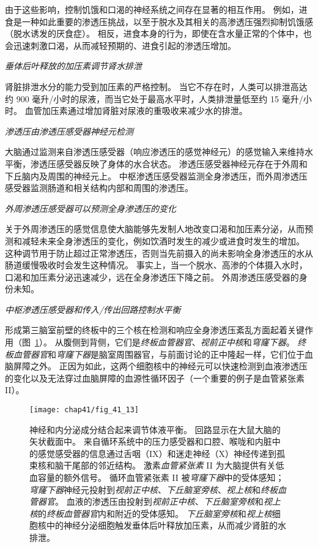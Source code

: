 由于这些影响，控制饥饿和口渴的神经系统之间存在显著的相互作用。
例如，进食是一种如此重要的渗透压挑战，以至于脱水及其相关的高渗透压强烈抑制饥饿感（脱水诱发的厌食症）。
相反，进食本身的行为，即使在含水量正常的个体中，也会迅速刺激口渴，从而减轻预期的、进食引起的渗透压增加。


\textit{垂体后叶释放的加压素调节肾水排泄}

肾脏排泄水分的能力受到加压素的严格控制。
当它不存在时，人类可以排泄高达约 900 毫升/小时的尿液，而当它处于最高水平时，人类排泄量低至约 15 毫升/小时。
血管加压素通过增加肾脏对尿液的重吸收来减少水的排泄。


\textit{渗透压由渗透压感受器神经元检测}

大脑通过监测来自渗透压感受器（响应渗透压的感觉神经元）的感觉输入来维持水平衡，渗透压感受器反映了身体的水合状态。
渗透压感受器神经元存在于外周和下丘脑内及周围的神经元上。
中枢渗透压感受器监测全身渗透压，而外周渗透压感受器监测肠道和相关结构内部和周围的渗透压。


\textit{外周渗透压感受器可以预测全身渗透压的变化}

关于外周渗透压的感觉信息使大脑能够先发制人地改变口渴和加压素分泌，从而预测和减轻未来全身渗透压的变化，例如饮酒时发生的减少或进食时发生的增加。
这种调节用于防止超过正常渗透压，否则当先前摄入的尚未影响全身渗透压的水从肠道缓慢吸收时会发生这种情况。
事实上，当一个脱水、高渗的个体摄入水时，口渴和加压素分泌迅速减少，远在全身渗透压下降之前。
外周渗透压感受器的身份未知。


\textit{中枢渗透压感受器和传入/传出回路控制水平衡}

形成第三脑室前壁的终板中的三个核在检测和响应全身渗透压紊乱方面起着关键作用（图~\ref{fig:41_13}）。
从腹侧到背侧，它们是\textit{终板血管器官}、\textit{视前正中核}和\textit{穹窿下器}。
\textit{终板血管器官}和\textit{穹窿下器}是脑室周围器官，与前面讨论的正中隆起一样，它们位于血脑屏障之外。
正因为如此，这两个细胞核中的神经元可以快速检测到血液渗透压的变化以及无法穿过血脑屏障的血源性循环因子（一个重要的例子是血管紧张素 II）。


\begin{figure}[htbp]
	\centering
	\texttt{[image: chap41/fig\_41\_13]}
	\caption{神经和内分泌成分结合起来调节体液平衡。
		回路显示在大鼠大脑的矢状截面中。
		来自循环系统中的压力感受器和口腔、喉咙和内脏中的感觉感受器的信息通过舌咽（IX）和迷走神经（X）神经传递到孤束核和脑干尾部的邻近结构。
		激素\textit{血管紧张素} II 为大脑提供有关低血容量的额外信号。
		循环血管紧张素 II 被\textit{穹窿下器}中的受体感知； 
		\textit{穹窿下器}神经元投射到\textit{视前正中核}、\textit{下丘脑室旁核}、\textit{视上核}和\textit{终板血管器官}。
		血液的渗透压由投射到\textit{视前正中核}、\textit{下丘脑室旁核}和\textit{视上核}的\textit{终板血管器官}内和附近的受体感知。
		\textit{下丘脑室旁核}和\textit{视上核}细胞核中的神经分泌细胞触发垂体后叶释放加压素，从而减少肾脏的水排泄\cite{swanson2000cerebral}。}
	\label{fig:41_13}
\end{figure}


